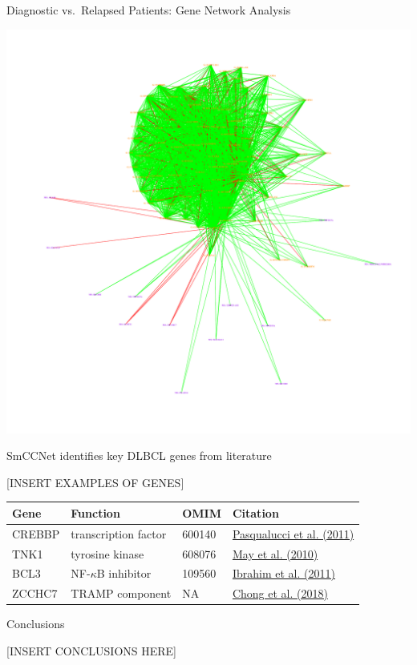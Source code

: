 \documentclass[ignorenonframetext,]{beamer}
\begin{document}
\begin{frame}{Diagnostic vs.~Relapsed Patients: Gene Network Analysis}
\protect\hypertarget{diagnostic-vs.relapsed-patients-gene-network-analysis}{}

\begin{center}\includegraphics[width=0.7\linewidth]{images/DRDCNet1} \end{center}

\end{frame}

\begin{frame}{SmCCNet identifies key DLBCL genes from literature}
\protect\hypertarget{smccnet-identifies-key-dlbcl-genes-from-literature}{}

{[}INSERT EXAMPLES OF GENES{]}

\begin{longtable}[]{@{}llll@{}}
\toprule
Gene & Function & OMIM & Citation\tabularnewline
\midrule
\endhead
CREBBP & transcription factor & 600140 &
\href{https://www.nature.com/articles/nature09730}{Pasqualucci et al.
(2011)}\tabularnewline
TNK1 & tyrosine kinase & 608076 &
\href{https://www.ncbi.nlm.nih.gov/pmc/articles/PMC2917161/}{May et al.
(2010)}\tabularnewline
BCL3 & NF-\(\kappa\)B inhibitor & 109560 &
\href{https://pubmed.ncbi.nlm.nih.gov/21752100/}{Ibrahim et al.
(2011)}\tabularnewline
ZCCHC7 & TRAMP component & NA &
\href{https://pubmed.ncbi.nlm.nih.gov/30348671/}{Chong et al.
(2018)}\tabularnewline
\bottomrule
\end{longtable}

\end{frame}

\begin{frame}{Conclusions}
\protect\hypertarget{conclusions}{}

{[}INSERT CONCLUSIONS HERE{]}

\end{frame}
\end{document}
